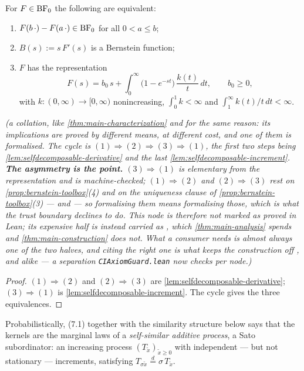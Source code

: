 \begin{lemma}\label{lem:selfdecomposable-exponents}
For $F \in \mathrm{BF}_0$ the following are equivalent:
\begin{enumerate}
\item $F(b\,\cdot) - F(a\,\cdot) \in \mathrm{BF}_0$ for all $0 < a \le b$;
\item $B(s) := s\,F'(s)$ is a Bernstein function;
\item $F$ has the representation
\[
  F(s) = b_0\, s + \int_0^\infty \bigl(1 - e^{-st}\bigr)\, \frac{k(t)}{t}\,dt,
  \qquad b_0 \ge 0, \tag{7.1}
\]
with $k : (0,\infty) \to [0,\infty)$ nonincreasing, $\int_0^1 k < \infty$ and
$\int_1^\infty k(t)/t\,dt < \infty$.
\end{enumerate}
\statusT\quad\emph{(a collation, like \ref{thm:main-characterization} and for the same reason:
its implications are proved by different means, at different cost, and one of them is
formalised. The cycle is $(1) \Rightarrow (2) \Rightarrow (3) \Rightarrow (1)$, the first two
steps being \ref{lem:selfdecomposable-derivative} and the last
\ref{lem:selfdecomposable-increment}. \textbf{The asymmetry is the point.}
$(3) \Rightarrow (1)$ is elementary from the representation and is machine-checked;
$(1) \Rightarrow (2)$ and $(2) \Rightarrow (3)$ rest on \ref{prop:bernstein-toolbox}(4) and on
the uniqueness clause of \ref{prop:bernstein-toolbox}(3) ---  and  --- so
formalising them means formalising those, which is what the trust boundary declines to do. This
node is therefore not marked as proved in Lean; its expensive half is instead carried as
, which \ref{thm:main-analysis} spends and \ref{thm:main-construction} does not.
What a consumer needs is almost always one of the two halves, and citing the right one is what
keeps the construction off ,  and  alike --- a separation
\texttt{CIAxiomGuard.lean} now checks per node.)}
\end{lemma}

\begin{proof}
$(1) \Rightarrow (2)$ and $(2) \Rightarrow (3)$ are \ref{lem:selfdecomposable-derivative};
$(3) \Rightarrow (1)$ is \ref{lem:selfdecomposable-increment}. The cycle gives the three
equivalences.
\end{proof}

\begin{remark}\label{rem:sato-reading}
Probabilistically, (7.1) together with the similarity structure
below says that the kernels are the marginal laws of a \emph{self-similar additive process},
a Sato subordinator: an increasing process $(T_{\tilde x})_{\tilde x \ge 0}$ with independent
--- but not stationary --- increments, satisfying
$T_{\sigma \tilde x} \stackrel{d}{=} \sigma\, T_{\tilde x}$.
\end{remark}

